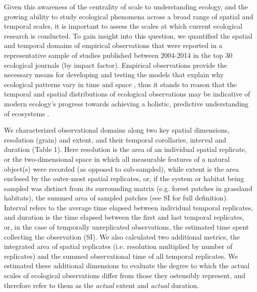 \documentclass[12pt]{article}
\begin{document}
Given this awareness of the centrality of scale to understanding ecology, and the growing ability to study ecological phenomena across a broad range of spatial and temporal scales, it is important to assess the scales at which current ecological research is conducted. To gain insight into this question, we quantified the spatial and temporal domains of empirical observations that were reported in a representative sample of studies published between 2004-2014 in the top 30 ecological journals (by impact factor). Empirical observations provide the necessary means for developing and testing the models that explain why ecological patterns vary in time and space \cite{levin_problem_1992, tilman_ecological_1989}, thus it stands to reason that the temporal and spatial distributions of ecological observations may be indicative of modern ecology's progress towards achieving a holistic, predictive understanding of ecosystems \cite{chave_problem_2013,levin_problem_1992}. 

We characterized observational domains along two key spatial dimensions, resolution (grain) and extent, and their temporal corollaries, interval and duration (Table 1).  Here resolution is the area of an individual spatial replicate, or the two-dimensional space in which all measurable features of a natural object(s) were recorded (as opposed to sub-sampled), while extent is the area enclosed by the outer-most spatial replicates, or, if the system or habitat being sampled was distinct from its surrounding matrix (e.g. forest patches in grassland habitats), the summed area of sampled patches (see SI for full definition). Interval refers to the average time elapsed between individual temporal replicates, and duration is the time elapsed between the first and last temporal replicates, or, in the case of temporally unreplicated observations, the estimated time spent collecting the observation (SI). We also calculated two additional metrics, the integrated area of spatial replicates (i.e. resolution multiplied by number of replicates) and the summed observational time of all temporal replicates. We estimated these additional dimensions to evaluate the degree to which the actual scales of ecological observations differ from those they ostensibly represent, and therefore refer to them as the \emph{actual} extent and \emph{actual} duration.
\end{document}
